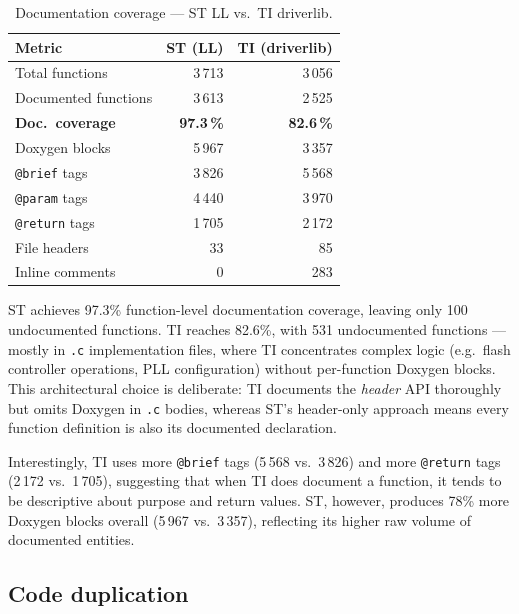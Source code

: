 \begin{table}[H]
\centering
\caption{Documentation coverage --- ST LL vs.\ TI driverlib.}
\label{tab:ti-doc}
\begin{tabular}{l r r}
\toprule
\textbf{Metric} & \textbf{ST (LL)} & \textbf{TI (driverlib)} \\
\midrule
Total functions         &   3\,713 &   3\,056 \\
Documented functions    &   3\,613 &   2\,525 \\
\textbf{Doc.\ coverage} & \textbf{97.3\,\%} & \textbf{82.6\,\%} \\
\midrule
Doxygen blocks          &   5\,967 &   3\,357 \\
\texttt{@brief} tags    &   3\,826 &   5\,568 \\
\texttt{@param} tags    &   4\,440 &   3\,970 \\
\texttt{@return} tags   &   1\,705 &   2\,172 \\
File headers            &      33  &      85  \\
Inline comments         &       0  &     283  \\
\bottomrule
\end{tabular}
\end{table}

ST achieves 97.3\% function-level documentation coverage, leaving only 100 undocumented
functions. TI reaches 82.6\%, with 531 undocumented functions --- mostly in \texttt{.c}
implementation files, where TI concentrates complex logic (e.g.\ flash controller
operations, PLL configuration) without per-function Doxygen blocks. This architectural
choice is deliberate: TI documents the \emph{header} API thoroughly but omits Doxygen in
\texttt{.c} bodies, whereas ST's header-only approach means every function definition is
also its documented declaration.

Interestingly, TI uses more \texttt{@brief} tags (5\,568 vs.\ 3\,826) and more
\texttt{@return} tags (2\,172 vs.\ 1\,705), suggesting that when TI does document a
function, it tends to be descriptive about purpose and return values. ST, however, produces
78\% more Doxygen blocks overall (5\,967 vs.\ 3\,357), reflecting its higher raw volume of
documented entities.

\subsection{Code duplication}
\label{subsec:ti-dup}

